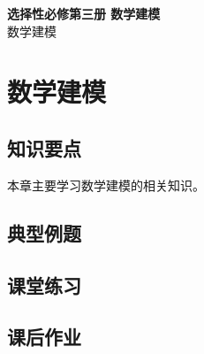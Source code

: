 \documentclass[12pt,a4paper]{article}
\begin{document}
\begin{center}
\LARGE\textbf{选择性必修第三册 数学建模} \\[0.5em]
\large 数学建模
\end{center}

\tableofcontents
\newpage

\section{数学建模}

\subsection{知识要点}
本章主要学习数学建模的相关知识。

\subsection{典型例题}

\subsection{课堂练习}

\subsection{课后作业}
\end{document}
